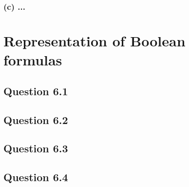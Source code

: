 \documentclass[10pt,a4paper]{article}
\begin{document}
\subsubsection*{(c) \mdseries ...}

\section{Representation of Boolean formulas}
\subsection*{Question 6.1}
\subsection*{Question 6.2}
\subsection*{Question 6.3}
\subsection*{Question 6.4}
\end{document}
